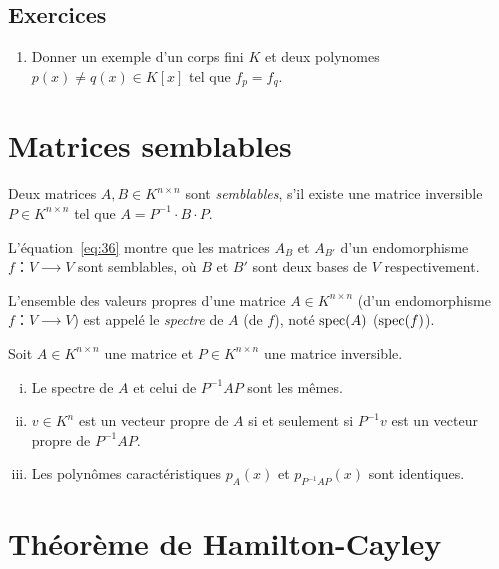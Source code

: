 \subsection*{Exercices}

\begin{enumerate}
\item Donner un exemple d'un corps fini $K$ et deux polynomes $p(x) ≠q(x) ∈ K[x]$ tel que $f_p=f_q$.
\end{enumerate}

\section{Matrices semblables}
\label{sec:matrices-semblables}

\begin{definition}
  \label{def:42}
  Deux matrices $A,B ∈K^{n×n}$ sont \emph{semblables}, s'il existe une matrice inversible $P ∈ K^{n ×n}$ tel que $A = P^{-1} ⋅B ⋅P$.  
\end{definition}
L'équation~\eqref{eq:36} montre que les matrices $A_B$ et $A_{B'}$ d'un endomorphisme $f：V⟶V$ sont semblables, où $B$ et $B'$ sont deux bases de $V$ respectivement.

\begin{definition}
  \label{def:43}
  L'ensemble des valeurs propres d'une matrice $A ∈ K^{n ×n}$ (d'un endomorphisme $f：V ⟶V$) est appelé le \emph{spectre} de $A$ (de $f$), noté $\operatorname{spec}(A)$ ($\operatorname{spec}(f)$). 
\end{definition}

\begin{theorem}
  \label{thr:46}
  Soit $A ∈ K^{n ×n}$ une matrice et $P ∈ K^{n ×n}$ une matrice inversible.
  \begin{enumerate}[i)]
  \item Le spectre de $A$ et celui de $P^{-1}AP$ sont les mêmes.
  \item $v ∈ K^n$ est un vecteur propre de $A$ si et seulement si $P^{-1} v$  est un vecteur propre de $P^{-1}AP$.
  \item Les polynômes caractéristiques $p_A(x)$ et $p_{P^{-1}AP}(x)$ sont identiques. 
  \end{enumerate}
\end{theorem}


\section{Théorème de Hamilton-Cayley}
\label{sec:theoreme-de-hamilton}


